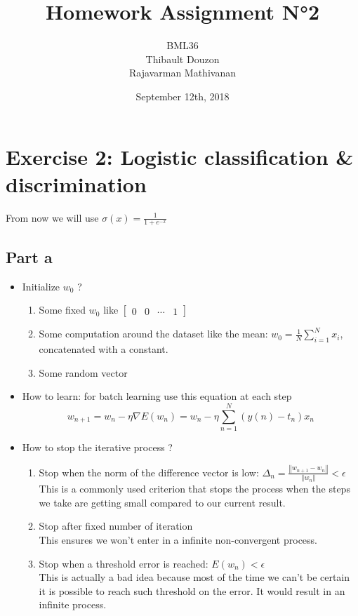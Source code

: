 \documentclass[a4paper, 10pt]{article}
\title{Homework Assignment N°2}
\author{BML36\\Thibault Douzon\\Rajavarman Mathivanan}
\date{September 12th, 2018}
\begin{document}
\maketitle

\pagebreak

\tableofcontents
\pagebreak

\section{Exercise 2: Logistic classification \& discrimination}
From now we will use $\sigma(x)=\frac{1}{1+e^{-x}}$
\subsection{Part a}
\begin{itemize}[label=$\square$]
    \item Initialize $w_0$ ?
    \begin{enumerate}
        \item Some fixed $w_0$ like $\begin{bmatrix}0 & 0 & \cdots & 1\end{bmatrix}$
        \item Some computation around the dataset like the mean: $w_0 = \frac{1}{N}\sum_{i=1}^N x_i$, concatenated with a constant.
        \item Some random vector
    \end{enumerate}
    \item How to learn: for batch learning use this equation at each step
    $$
    w_{n+1} = w_n - \eta \nabla E(w_n) = w_n - \eta \sum_{n=1}^{N}\left(y(n)-t_n\right)x_n
    $$
    \item How to stop the iterative process ?
    \begin{enumerate}
    \item Stop when the norm of the difference vector is low: $\Delta_n = \frac{\left\Vert w_{n+1} - w_n\right\Vert}{\left\Vert w_n \right\Vert} < \epsilon$
    \\
    This is a commonly used criterion that stops the process when the steps we take are getting small compared to our current result.
    \item Stop after fixed number of iteration
    \\
    This ensures we won't enter in a infinite non-convergent process. 
    \item Stop when a threshold error is reached: $E(w_n) < \epsilon $
    \\
    This is actually a bad idea because most of the time we can't be certain it is possible to reach such threshold on the error.
    It would result in an infinite process.
    \end{enumerate}
\end{itemize}
\end{document}
